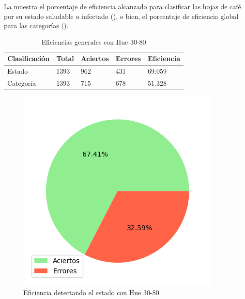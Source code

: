 La  muestra el porcentaje de eficiencia alcanzado para clasificar las hojas de café por su estado saludable o infectado (), o bien, el porcentaje de eficiencia global para las categorías ().

\begin{table}[h!]
\centering
\begin{tabular}{|l|l|l|l|l|}
\hline 
\textbf{Clasificación} & \textbf{Total} & \textbf{Aciertos} & \textbf{Errores} & \textbf{Eficiencia} \\
\hline
Estado & 1393 & 962 & 431 & 69.059 \\
\hline 
Categoría & 1393 & 715 & 678 & 51.328 \\
\hline 
\end{tabular}
\caption{Eficiencias generales con Hue 30-80}
\label{table:efficiency_general_30_80}
\end{table}

\captionsetup[figure]{skip=-10pt}

\begin{figure}[!ht]
\centering
\includegraphics[scale=0.6]{images/result_global_state_30_80.png}
\caption{Eficiencia detectando el estado con Hue 30-80}
\label{img:efficiency_state_30_80}
\end{figure}

